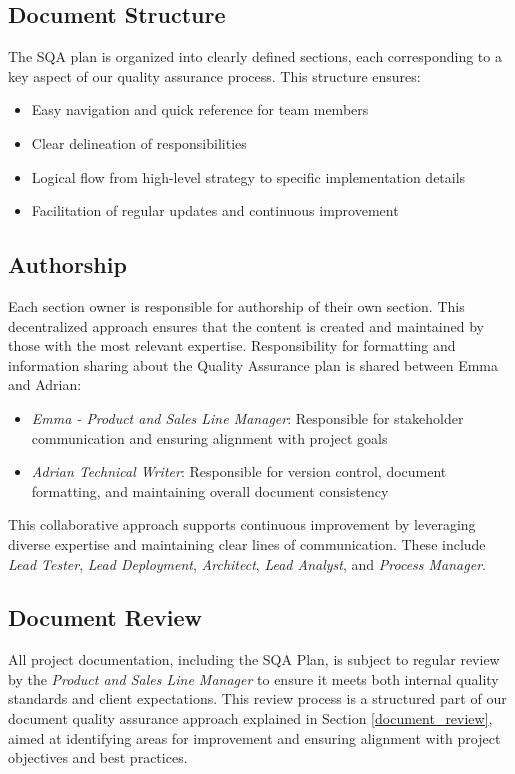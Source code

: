 \documentclass{article}
\begin{document}
\subsection{Document Structure}
The SQA plan is organized into clearly defined sections, each corresponding to a key aspect of our quality assurance process. This structure ensures:

\begin{itemize}
    \item Easy navigation and quick reference for team members
    \item Clear delineation of responsibilities
    \item Logical flow from high-level strategy to specific implementation details
    \item Facilitation of regular updates and continuous improvement
\end{itemize}

\subsection{Authorship}
Each section owner is responsible for authorship of their own section. This decentralized approach ensures that the content is created and maintained by those with the most relevant expertise. Responsibility for formatting and information sharing about the Quality Assurance plan is shared between Emma and Adrian:

\begin{itemize}
    \item \textit{Emma - Product and Sales Line Manager}: Responsible for stakeholder communication and ensuring alignment with project goals
    \item \textit{Adrian Technical Writer}: Responsible for version control, document formatting, and maintaining overall document consistency
\end{itemize}

This collaborative approach supports continuous improvement by leveraging diverse expertise and maintaining clear lines of communication. These include \textit{Lead Tester}, \textit{Lead Deployment}, \textit{Architect}, \textit{Lead Analyst}, and \textit{Process Manager}.

\subsection{Document Review}
All project documentation, including the SQA Plan, is subject to regular review by the \textit{Product and Sales Line Manager} to ensure it meets both internal quality standards and client expectations. This review process is a structured part of our document quality assurance approach explained in Section \ref{document_review}, aimed at identifying areas for improvement and ensuring alignment with project objectives and best practices.
\end{document}
